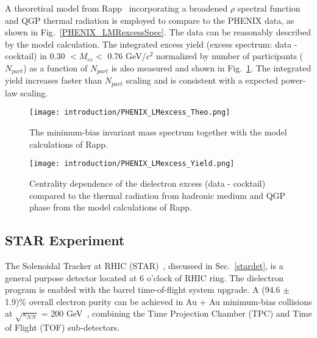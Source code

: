 A theoretical model from Rapp~\cite{broaden0,broaden1,broaden4} incorporating a broadened $\rho$ spectral function and QGP thermal radiation is employed to compare to the PHENIX data, as shown in Fig.~\ref{PHENIX_LMRexcessSpec}. The data can be reasonably described by the model calculation. The integrated excess yield (excess spectrum: data - cocktail) in 0.30 $<M_{ee}<$ 0.76 GeV/$c^{2}$ normalized by number of participants ($N_{part}$) as a function of $N_{part}$ is also measured and shown in Fig.~\ref{PHENIX_LMRexcessYield}. The integrated yield increases faster than $N_{part}$ scaling and is consistent with a expected power-law scaling.

\begin{figure}[htbp]
\begin{minipage}[htbp]{0.49\linewidth}
\centering
\texttt{[image: introduction/PHENIX\_LMexcess\_Theo.png]}
\caption{The minimum-bias invariant mass spectrum together with the model calculations of Rapp. \label{PHENIX_LMRexcessSpec}}
\end{minipage}
\hfill
\begin{minipage}[htbp]{0.49\linewidth}
\centering
\texttt{[image: introduction/PHENIX\_LMexcess\_Yield.png]} 
\caption{Centrality dependence of the dielectron excess (data - cocktail) compared to the thermal radiation from hadronic medium and QGP phase from the model calculations of Rapp.\label{PHENIX_LMRexcessYield}}
\end{minipage}
\end{figure}

\subsection{STAR Experiment}
The Solenoidal Tracker at RHIC (STAR)~\cite{STARdet}, discussed in Sec.~\ref{stardet}, is a general purpose detector located at 6 o'clock of RHIC ring. The dielectron program is enabled with the barrel time-of-flight system upgrade. A (94.6 $\pm$ 1.9)\% overall electron purity can be achieved in Au + Au minimum-bias collisions at $\sqrt{s_{NN}}$ = 200 GeV~\cite{STAR:dielectron1}, combining the Time Projection Chamber (TPC) and Time of Flight (TOF) sub-detectors. 

